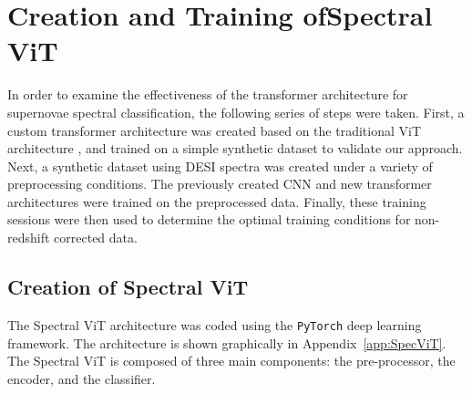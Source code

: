 \chapter[Creation and Training of Spectral ViT]{Creation and Training of\newline Spectral ViT}
\label{chap:methods}

In order to examine the effectiveness of the transformer architecture for supernovae
spectral classification, the following series of steps were taken. First, a custom transformer 
architecture was created based on the traditional ViT architecture \parencite{dosovitskiy2020}, 
and trained on a simple synthetic dataset to validate our approach. Next, a synthetic dataset 
using DESI spectra was created under a variety of preprocessing conditions. The previously 
created CNN and new transformer architectures were trained on the
preprocessed data. Finally, these training sessions were then used to determine 
the optimal training conditions for non-redshift corrected data. 

\section{Creation of Spectral ViT}\label{sec:SpecViT}
The Spectral ViT architecture was coded using the \texttt{PyTorch}
deep learning framework. The architecture is shown graphically in
Appendix~\ref{app:SpecViT}. The Spectral ViT is
composed of three main components: the pre-processor, the encoder, and the classifier. 

